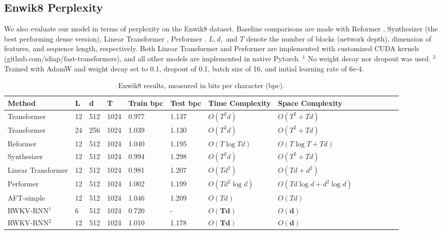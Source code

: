 \documentclass[11pt]{article}
\begin{document}
\subsection{Enwik8 Perplexity}\label{app:enwik8}

We also evaluate our model in terms of perplexity on the Enwik8 dataset. Baseline comparisons are made with Reformer \citep{reformer}, Synthesizer \citep{synthesizer} (the best performing dense version), Linear Transformer \citep{katharopoulos2020transformers}, Performer \citep{performer}. $L, d,$ and $T$ denote the number of blocks (network depth), dimension of features, and sequence length, respectively. Both Linear Transformer and Performer are implemented with customized CUDA kernels (github.com/idiap/fast-transformers), and all other models are implemented in native Pytorch. $^1$ No weight decay nor dropout was used. $^2$ Trained with AdamW and weight decay set to 0.1, dropout of 0.1,  batch size of 16, and initial learning rate of 6e-4.

\begin{table}[htbp]
\small
    \centering
    \begin{tabular}{llllllllllllll}
 \toprule
 Method & L& d  &T &Train bpc & Test bpc & Time Complexity & Space Complexity\\
 \midrule
 Transformer&  12& 512& 1024&0.977& 1.137&$O(T^2d)$&$O(T^2 + Td)$ \\
 Transformer&  24& 256& 1024&1.039& 1.130&$O(T^2d)$&$O(T^2 + Td)$ \\
    \midrule
 Reformer& 12 & 512& 1024& 1.040 &  1.195& $O(T\log{T}  d)$&$O(T\log{T} + Td)$ \\
 Synthesizer&  12& 512& 1024& 0.994 & 1.298& $O(T^2d)$&$O(T^2 + Td)$  \\
 Linear Transformer& 12& 512& 1024&0.981& 1.207& $O(T d^2)$&$O(Td + d^2)$ \\
 Performer&  12& 512& 1024&1.002& 1.199& $O(T d^2\log{d})$&$O(Td\log{d} + d^2\log{d})$  \\
  AFT-simple &  12& 512& 1024&1.046& 1.209& $O(Td)$&$O(Td)$  \\
 \midrule
RWKV-RNN$^1$ &  6 & 512  & 1024 & 0.720 & -  & $O(\mathbf{Td})$&$O(\mathbf{d})$ \\
RWKV-RNN$^2$ &  12 & 512  & 1024 & 1.010 & 1.178  & $O(\mathbf{Td})$&$O(\mathbf{d})$ \\
  \bottomrule    
    \end{tabular}
        \caption{Enwik8 results, measured in bits per character (bpc).}
\label{tab:enwik8}
\end{table}{}
\end{document}
